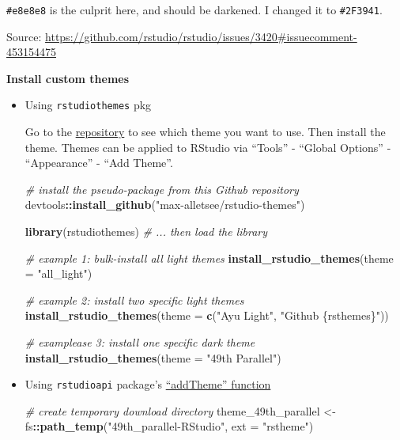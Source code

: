 \documentclass[
  a4paper,
  twoside,
  openright]{book}
\newenvironment{Shaded}{\begin{snugshade}}{\end{snugshade}}
\newcommand{\AttributeTok}[1]{\textcolor[rgb]{0.13,0.29,0.53}{#1}}
\newcommand{\CommentTok}[1]{\textcolor[rgb]{0.56,0.35,0.01}{\textit{#1}}}
\newcommand{\FunctionTok}[1]{\textcolor[rgb]{0.13,0.29,0.53}{\textbf{#1}}}
\newcommand{\NormalTok}[1]{#1}
\newcommand{\OtherTok}[1]{\textcolor[rgb]{0.56,0.35,0.01}{#1}}
\newcommand{\SpecialCharTok}[1]{\textcolor[rgb]{0.81,0.36,0.00}{\textbf{#1}}}
\newcommand{\StringTok}[1]{\textcolor[rgb]{0.31,0.60,0.02}{#1}}
\theoremstyle{definition}
\theoremstyle{definition}
\theoremstyle{definition}
\theoremstyle{definition}
\theoremstyle{remark}
\begin{document}
\texttt{\#e8e8e8} is the culprit here, and should be darkened. I changed it to \texttt{\#2F3941}.

Source: \url{https://github.com/rstudio/rstudio/issues/3420\#issuecomment-453154475}

\textbf{Install custom themes}

\begin{itemize}
\item
  Using \texttt{rstudiothemes} pkg

  Go to the \href{https://github.com/max-alletsee/rstudio-themes?tab=readme-ov-file}{repository} to see which theme you want to use. Then install the theme. Themes can be applied to RStudio via ``Tools'' - ``Global Options'' - ``Appearance'' - ``Add Theme''.

\begin{Shaded}
\begin{Highlighting}[]
\CommentTok{\# install the pseudo{-}package from this Github repository}
\NormalTok{devtools}\SpecialCharTok{::}\FunctionTok{install\_github}\NormalTok{(}\StringTok{"max{-}alletsee/rstudio{-}themes"}\NormalTok{)}

\FunctionTok{library}\NormalTok{(rstudiothemes) }\CommentTok{\# ... then load the library}

\CommentTok{\# example 1: bulk{-}install all light themes}
\FunctionTok{install\_rstudio\_themes}\NormalTok{(}\AttributeTok{theme =} \StringTok{"all\_light"}\NormalTok{)}

\CommentTok{\# example 2: install two specific light themes}
\FunctionTok{install\_rstudio\_themes}\NormalTok{(}\AttributeTok{theme =} \FunctionTok{c}\NormalTok{(}\StringTok{"Ayu Light"}\NormalTok{, }\StringTok{"Github \{rsthemes\}"}\NormalTok{))}

\CommentTok{\# examplease 3: install one specific dark theme}
\FunctionTok{install\_rstudio\_themes}\NormalTok{(}\AttributeTok{theme =} \StringTok{"49th Parallel"}\NormalTok{)}
\end{Highlighting}
\end{Shaded}
\item
  Using \texttt{rstudioapi} package's \href{https://rdrr.io/cran/rstudioapi/man/addTheme.html}{``addTheme'' function}

\begin{Shaded}
\begin{Highlighting}[]
\CommentTok{\# create temporary download directory}
\NormalTok{theme\_49th\_parallel }\OtherTok{\textless{}{-}}\NormalTok{ fs}\SpecialCharTok{::}\FunctionTok{path\_temp}\NormalTok{(}\StringTok{"49th\_parallel{-}RStudio"}\NormalTok{, }
                                     \AttributeTok{ext =} \StringTok{"rstheme"}\NormalTok{)}


\end{Highlighting}
\end{Shaded}
\end{itemize}
\end{document}
